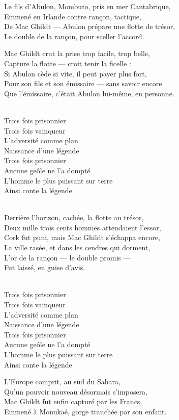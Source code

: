 \begin{lyrics}
Le fils d'Abulon, Mombuto, pris en mer Cantabrique,\\
Emmené en Irlande contre rançon, tactique,\\
De Mac Ghildt — Abulon prépare une flotte de trésor,\\
Le double de la rançon, pour sceller l'accord.

Mac Ghildt crut la prise trop facile, trop belle,\\
Capture la flotte — croit tenir la ficelle :\\
Si Abulon cède si vite, il peut payer plus fort,\\
Pour son fils et son émissaire — sans savoir encore\\
Que l'émissaire, c'était Abulon lui-même, en personne.

\\
Trois fois prisonnier\\
Trois fois vainqueur\\
L'adversité comme plan\\
Naissance d'une légende\\
Trois fois prisonnier\\
Aucune geôle ne l'a dompté\\
L'homme le plus puissant sur terre\\
Ainsi conte la légende

\\
Derrière l'horizon, cachée, la flotte au trésor,\\
Deux mille trois cents hommes attendaient l'essor,\\
Cork fut puni, mais Mac Ghildt s'échappa encore,\\
La ville rasée, et dans les cendres qui dorment,\\
L'or de la rançon — le double promis —\\
Fut laissé, en guise d'avis.

\\
Trois fois prisonnier\\
Trois fois vainqueur\\
L'adversité comme plan\\
Naissance d'une légende\\
Trois fois prisonnier\\
Aucune geôle ne l'a dompté\\
L'homme le plus puissant sur terre\\
Ainsi conte la légende

L'Europe comprit, au sud du Sahara,\\
Qu'un pouvoir nouveau désormais s'imposera,\\
Mac Ghildt fut enfin capturé par les Francs,\\
Emmené à Monukaé, gorge tranchée par son enfant.
\end{lyrics}

